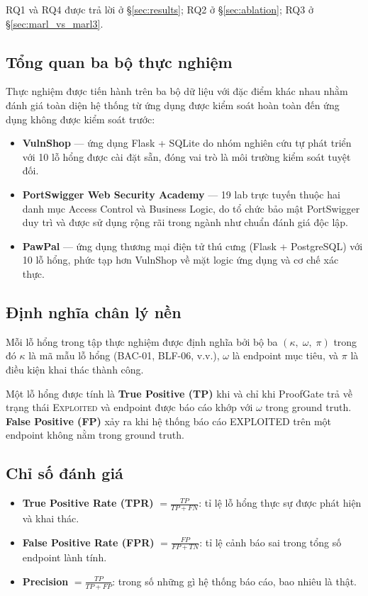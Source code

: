 \noindent RQ1 và RQ4 được trả lời ở \S\ref{sec:results}; RQ2 ở \S\ref{sec:ablation}; RQ3 ở \S\ref{sec:marl_vs_marl3}.

\subsection{Tổng quan ba bộ thực nghiệm}

Thực nghiệm được tiến hành trên ba bộ dữ liệu với đặc điểm khác nhau nhằm đánh giá toàn diện hệ thống từ ứng dụng được kiểm soát hoàn toàn đến ứng dụng không được kiểm soát trước:

\begin{itemize}
    \item \textbf{VulnShop} --- ứng dụng Flask + SQLite do nhóm nghiên cứu tự phát triển với 10 lỗ hổng được cài đặt sẵn, đóng vai trò là môi trường kiểm soát tuyệt đối.
    \item \textbf{PortSwigger Web Security Academy} --- 19 lab trực tuyến thuộc hai danh mục Access Control và Business Logic, do tổ chức bảo mật PortSwigger duy trì và được sử dụng rộng rãi trong ngành như chuẩn đánh giá độc lập.
    \item \textbf{PawPal} --- ứng dụng thương mại điện tử thú cưng (Flask + PostgreSQL) với 10 lỗ hổng, phức tạp hơn VulnShop về mặt logic ứng dụng và cơ chế xác thực.
\end{itemize}

\subsection{Định nghĩa chân lý nền}

Mỗi lỗ hổng trong tập thực nghiệm được định nghĩa bởi bộ ba $(\kappa,\; \omega,\; \pi)$ trong đó $\kappa$ là mã mẫu lỗ hổng (BAC-01, BLF-06, v.v.), $\omega$ là endpoint mục tiêu, và $\pi$ là điều kiện khai thác thành công.

Một lỗ hổng được tính là \textbf{True Positive (TP)} khi và chỉ khi ProofGate trả về trạng thái \textsc{Exploited} và endpoint được báo cáo khớp với $\omega$ trong ground truth. \textbf{False Positive (FP)} xảy ra khi hệ thống báo cáo EXPLOITED trên một endpoint không nằm trong ground truth.

\subsection{Chỉ số đánh giá}

\begin{itemize}
    \item \textbf{True Positive Rate (TPR)} $= \frac{TP}{TP + FN}$: tỉ lệ lỗ hổng thực sự được phát hiện và khai thác.
    \item \textbf{False Positive Rate (FPR)} $= \frac{FP}{FP + TN}$: tỉ lệ cảnh báo sai trong tổng số endpoint lành tính.
    \item \textbf{Precision} $= \frac{TP}{TP + FP}$: trong số những gì hệ thống báo cáo, bao nhiêu là thật.
\end{itemize}

